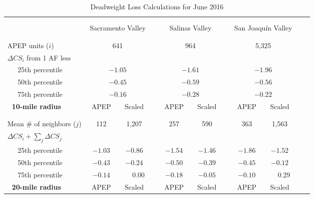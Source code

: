 \begin{table}\centering
\caption{\normalsize Deadweight Loss Calculations for June 2016}
\label{tab:externality_calcs}
\small
\begin{adjustbox}{center} 
\begin{tabular}{lcccccccccc}
\hline
\hline
\\ 
\vspace{-8mm}
\\
& \multicolumn{2}{c}{Sacramento Valley}
&& \multicolumn{2}{c}{Salinas Valley} 
&&  \multicolumn{2}{c}{San Joaqu\'{i}n Valley} \\
[.1em]
\cline{2-9}
\\
\vspace{-9mm}
\\
APEP units ($i$) &  \multicolumn{2}{c}{641} &&  \multicolumn{2}{c}{964} &&  \multicolumn{2}{c}{5,325} \\ 
[.5em]
$\Delta CS_i$ from 1 AF less \\ 
[.15em]
~~~25th percentile   &  \multicolumn{2}{c}{$-1.05$} &&  \multicolumn{2}{c}{$-1.61$} &&  \multicolumn{2}{c}{$-1.96$}\\  
[.05em]
~~~50th percentile  &  \multicolumn{2}{c}{$-0.45$} &&  \multicolumn{2}{c}{$-0.59$} &&  \multicolumn{2}{c}{$-0.56$} \\ 
[.05em]
~~~75th percentile  &  \multicolumn{2}{c}{$-0.16$} &&  \multicolumn{2}{c}{$-0.28$} &&  \multicolumn{2}{c}{$-0.22$} \\ 
[1.5em]
\multicolumn{1}{c}{\bf 10-mile radius~~~~}  & ~APEP~ & ~Scaled~ & &  ~APEP~ & ~Scaled~ & & ~APEP~ & ~Scaled~ \\ 
[.2em]
\hline
\\
\vspace{-9mm}
\\
Mean \# of neighbors ($j$) & 112 & 1,207 && 257 & 590 && 363 & 1,563 \\
[.5em]
$\Delta CS_i + \sum_j \Delta CS_j$    \\ 
[.15em]
~~~25th percentile  & $-1.03$ & $-0.86$ && $-1.54$ & $-1.46$ && $-1.86$ & $-1.52$ \\  
[.05em]
~~~50th percentile  & $-0.43$ & $-0.24$ && $-0.50$ & $-0.39$ && $-0.45$ & $-0.12$ \\  
[.05em]
~~~75th percentile  & $-0.14$ & $\mathbf{\phantom{-}0.00}$ && $-0.18$ & $-0.05$ && $-0.10$ & $\mathbf{\phantom{-}0.29}$ \\  
[1.5em]
\multicolumn{1}{c}{\bf 20-mile radius~~~~}  & ~APEP~ & ~Scaled~ & &  ~APEP~ & ~Scaled~ & & ~APEP~ & ~Scaled~ \\ 

\end{tabular}
\end{adjustbox}
\end{table}
